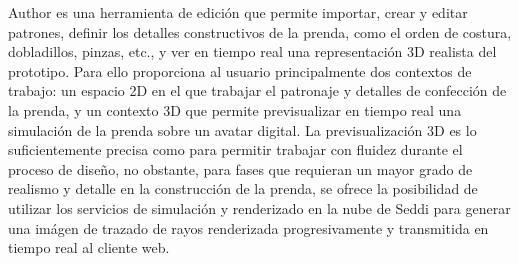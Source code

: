Author es una herramienta de edici\'on que permite importar, crear y editar patrones, definir los detalles constructivos de la prenda,
como el orden de costura, dobladillos, pinzas, etc., y ver en tiempo real una representaci\'on 3D realista del prototipo.
Para ello proporciona al usuario principalmente dos contextos de trabajo: un espacio 2D en el que trabajar el patronaje y detalles
de confecci\'on de la prenda, y un contexto 3D que permite previsualizar en tiempo real una simulaci\'on de la prenda sobre
un avatar digital. La previsualizaci\'on 3D es lo suficientemente precisa como para permitir trabajar con fluidez durante
el proceso de dise\~no, no obstante, para fases que requieran un mayor grado de realismo y detalle en la construcci\'on de la
prenda, se ofrece la posibilidad de utilizar los servicios de simulaci\'on y renderizado en la nube de Seddi para generar una
im\'agen de trazado de rayos renderizada progresivamente y transmitida en tiempo real al cliente web.\\










